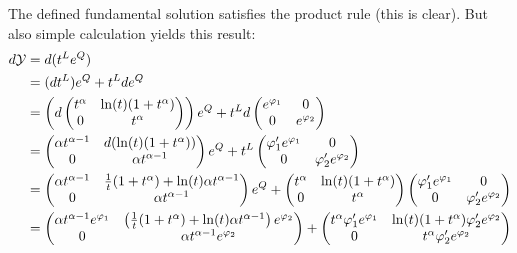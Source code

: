 \begin{rem}
  The defined fundamental solution satisfies the product rule (this is clear).
  But also simple calculation yields this result:
  \begin{align*}
    d\mathcal{Y}&=d(t^Le^Q)
    \\&=(dt^L)e^Q + t^Lde^Q
    \\&=\left(d\begin{pmatrix}
      t^\alpha & \ln(t)(1+t^\alpha) \\ 0 & t^\alpha
    \end{pmatrix}\right)e^Q
    +
    t^Ld\begin{pmatrix}
      e^{\varphi_1} & 0 \\ 0 & e^{\varphi_2}
    \end{pmatrix}
    \\&=\begin{pmatrix}
      \alpha t^{\alpha-1} & d(\ln(t)(1+t^\alpha)) \\ 0 & \alpha t^{\alpha-1}
    \end{pmatrix}e^Q
    +
    t^L\begin{pmatrix}
      \varphi_1'e^{\varphi_1} & 0 \\ 0 & \varphi_2'e^{\varphi_2}
    \end{pmatrix}
    \\&=\begin{pmatrix}
      \alpha t^{\alpha-1} & \frac{1}{t}(1+t^\alpha) + \ln(t)\alpha t^{\alpha-1}
      \\ 0 & \alpha t^{\alpha-1}
    \end{pmatrix}e^Q
    +
    \begin{pmatrix}
      t^\alpha & \ln(t)(1+t^\alpha) \\ 0 & t^\alpha
    \end{pmatrix} \begin{pmatrix}
      \varphi_1'e^{\varphi_1} & 0 \\ 0 & \varphi_2'e^{\varphi_2}
    \end{pmatrix}
    \\&=\begin{pmatrix}
      \alpha t^{\alpha-1}e^{\varphi_1} 
      & \left(\frac{1}{t}(1+t^\alpha)+\ln(t)\alpha t^{\alpha-1}\right)e^{\varphi_2}
      \\ 0 & \alpha t^{\alpha-1}e^{\varphi_2}
    \end{pmatrix}
    +
    \begin{pmatrix}
      t^\alpha\varphi_1'e^{\varphi_1} & \ln(t)(1+t^\alpha)\varphi_2'e^{\varphi_2}
      \\ 0 & t^\alpha\varphi_2'e^{\varphi_2}

\end{pmatrix}
\end{align*}
\end{rem}
